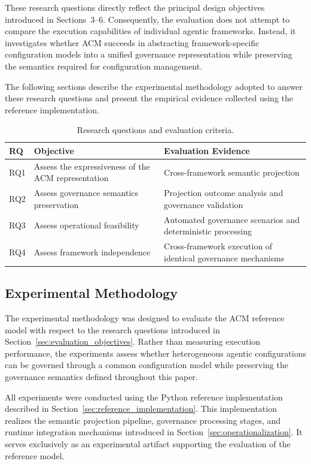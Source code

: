 \documentclass[10pt]{article}
\begin{document}
These research questions directly reflect the principal design objectives introduced in Sections~3--6. Consequently, the evaluation does not attempt to compare the execution capabilities of individual agentic frameworks. Instead, it investigates whether ACM succeeds in abstracting framework-specific configuration models into a unified governance representation while preserving the semantics required for configuration management.

The following sections describe the experimental methodology adopted to answer these research questions and present the empirical evidence collected using the reference implementation.

\begin{table}[ht]
\centering
\caption{Research questions and evaluation criteria.}
\label{tab:research_questions}
\begin{tabular}{p{1cm} p{4.6cm} p{5.8cm}}
\toprule
\textbf{RQ} & \textbf{Objective} & \textbf{Evaluation Evidence} \\
\midrule
RQ1 & Assess the expressiveness of the ACM representation & Cross-framework semantic projection \\
RQ2 & Assess governance semantics preservation & Projection outcome analysis and governance validation \\
RQ3 & Assess operational feasibility & Automated governance scenarios and deterministic processing \\
RQ4 & Assess framework independence & Cross-framework execution of identical governance mechanisms \\
\bottomrule
\end{tabular}
\end{table}
\subsection{Experimental Methodology}
\label{sec:evaluation_methodology}

The experimental methodology was designed to evaluate the ACM reference model with respect to the research questions introduced in Section~\ref{sec:evaluation_objectives}. Rather than measuring execution performance, the experiments assess whether heterogeneous agentic configurations can be governed through a common configuration model while preserving the governance semantics defined throughout this paper.

All experiments were conducted using the Python reference implementation described in Section~\ref{sec:reference_implementation}. This implementation realizes the semantic projection pipeline, governance processing stages, and runtime integration mechanisms introduced in Section~\ref{sec:operationalization}. It serves exclusively as an experimental artifact supporting the evaluation of the reference model.
\end{document}
